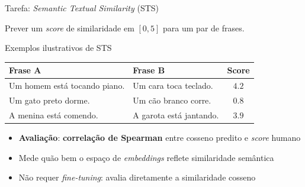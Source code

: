 \documentclass[aspectratio=169, xcolor=dvipsnames]{beamer}
\begin{document}
  \begin{frame}{Tarefa: \textit{Semantic Textual Similarity} (STS)}
    
    Prever um \textit{score} de similaridade em $[0, 5]$ para um par de frases.
    \vspace{0.4em}
    \begin{exampleblock}{Exemplos ilustrativos de STS}
      \small
      \begin{tabular}{p{5.3cm}p{5.3cm}c}
        \toprule
        \textbf{Frase A} & \textbf{Frase B} & \textbf{Score} \\
        \midrule
        Um homem está tocando piano. & Um cara toca teclado. & $4.2$ \\
        Um gato preto dorme. & Um cão branco corre. & $0.8$ \\
        A menina está comendo. & A garota está jantando. & $3.9$ \\
        \bottomrule
      \end{tabular}
    \end{exampleblock}
    \vspace{0.4em}
    \begin{itemize}
      \item \textbf{Avaliação}: \textbf{correlação de Spearman} entre cosseno predito e \textit{score} humano
      \item Mede quão bem o espaço de \textit{embeddings} reflete similaridade semântica
      \item Não requer \textit{fine-tuning}: avalia diretamente a similaridade cosseno
    \end{itemize}
  \end{frame}
\end{document}
